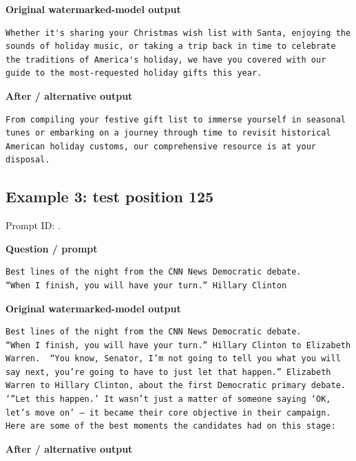 \textbf{Original watermarked-model output}

\begin{Verbatim}
Whether it's sharing your Christmas wish list with Santa, enjoying the sounds of holiday music, or taking a trip back in time to celebrate the traditions of America's holiday, we have you covered with our guide to the most-requested holiday gifts this year.
\end{Verbatim}

\textbf{After / alternative output}

\begin{Verbatim}
From compiling your festive gift list to immerse yourself in seasonal tunes or embarking on a journey through time to revisit historical American holiday customs, our comprehensive resource is at your disposal.
\end{Verbatim}

\subsection{Example 3: test position
125}\label{record-docs-watermarking-qualitative-paper-kgw-bira-md-example-3-test-position-125}

Prompt ID:
\texttt{}.

\textbf{Question / prompt}

\begin{Verbatim}
Best lines of the night from the CNN News Democratic debate.
“When I finish, you will have your turn.” Hillary Clinton
\end{Verbatim}

\textbf{Original watermarked-model output}

\begin{Verbatim}
Best lines of the night from the CNN News Democratic debate.
“When I finish, you will have your turn.” Hillary Clinton to Elizabeth Warren.  “You know, Senator, I’m not going to tell you what you will say next, you’re going to have to just let that happen.” Elizabeth Warren to Hillary Clinton, about the first Democratic primary debate.  ‘”Let this happen.’ It wasn’t just a matter of someone saying ‘OK, let’s move on’ – it became their core objective in their campaign. Here are some of the best moments the candidates had on this stage:
\end{Verbatim}

\textbf{After / alternative output}

